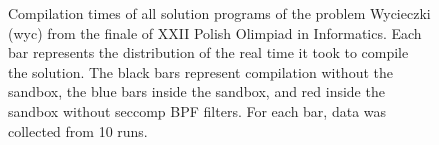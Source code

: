 \documentclass[en]{pracamgr}
\begin{document}
\begin{appendices}
\begin{figure}[H]
\caption{Compilation times of all solution programs of the problem Wycieczki (wyc) from the finale of XXII Polish Olimpiad in Informatics. Each bar represents the distribution of the real time it took to compile the solution. The black bars represent compilation without the sandbox, the blue bars inside the sandbox, and red inside the sandbox without seccomp BPF filters. For each bar, data was collected from 10 runs.}
\label{figure:wyc_compilation_real_time}
\end{figure}


\end{appendices}
\end{document}
